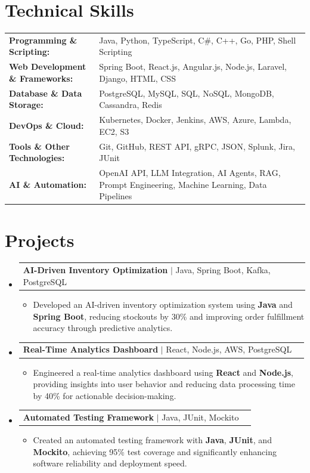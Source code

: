 \documentclass[letterpaper,10pt]{article}
\makeatletter
\newcommand{\resumeItem}[1]{
  \item{\fontsize{8pt}{9pt}\selectfont
    #1 \vspace{-3pt}
  }
}
\newcommand{\resumeProjectHeading}[2]{
    \item
    \begin{tabular*}{1.001\textwidth}{l@{\extracolsep{\fill}}r}
      \fontsize{8.5pt}{10pt}#1 & \textbf{\fontsize{8.5pt}{10pt} #2}\\
    \end{tabular*}\vspace{-7pt}
}
\newcommand{\resumeSubHeadingListStart}{\begin{itemize}[leftmargin=0pt, label={}]}
\newcommand{\resumeSubHeadingListEnd}{\end{itemize}}
\newcommand{\resumeItemListStart}{\begin{itemize}[leftmargin=*]}
\newcommand{\resumeItemListEnd}{\end{itemize}\vspace{-5pt}}
\makeatother
\begin{document}
\section{Technical Skills}
        \vspace{-14pt}
        \begin{table}[h]
            \fontsize{8pt}{9pt}\selectfont
            \begin{tabular}{p{0.3\linewidth} p{0.7\linewidth}}
                \textbf{Programming \& Scripting:} & Java, Python, TypeScript, C\#, C++, Go, PHP, Shell Scripting \\
                \textbf{Web Development \& Frameworks:} & Spring Boot, React.js, Angular.js, Node.js, Laravel, Django, HTML, CSS \\
                \textbf{Database \& Data Storage:} & PostgreSQL, MySQL, SQL, NoSQL, MongoDB, Cassandra, Redis \\
                \textbf{DevOps \& Cloud:} & Kubernetes, Docker, Jenkins, AWS, Azure, Lambda, EC2, S3 \\
                \textbf{Tools \& Other Technologies:} & Git, GitHub, REST API, gRPC, JSON, Splunk, Jira, JUnit \\
                \textbf{AI \& Automation:} & OpenAI API, LLM Integration, AI Agents, RAG, Prompt Engineering, Machine Learning, Data Pipelines \\
            \end{tabular}
        \end{table}
 \vspace{-18pt}

\section{Projects}
    \vspace{-5pt}
    \resumeSubHeadingListStart
          \resumeProjectHeading
            {\textbf{AI-Driven Inventory Optimization} $|$ Java, Spring Boot, Kafka, PostgreSQL}{}
            \resumeItemListStart
                \resumeItem{Developed an AI-driven inventory optimization system using \textbf{Java} and \textbf{Spring Boot}, reducing stockouts by 30\% and improving order fulfillment accuracy through predictive analytics.}
            \resumeItemListEnd
        \vspace{-12pt}
    
        \resumeProjectHeading
            {\textbf{Real-Time Analytics Dashboard} $|$ React, Node.js, AWS, PostgreSQL}{}
        \resumeItemListStart
                \resumeItem{Engineered a real-time analytics dashboard using \textbf{React} and \textbf{Node.js}, providing insights into user behavior and reducing data processing time by 40\% for actionable decision-making.}
        \resumeItemListEnd
      \vspace{-12pt}
      \resumeProjectHeading
        {\textbf{Automated Testing Framework} $|$ Java, JUnit, Mockito}{}
    \resumeItemListStart
            \resumeItem{Created an automated testing framework with \textbf{Java}, \textbf{JUnit}, and \textbf{Mockito}, achieving 95\% test coverage and significantly enhancing software reliability and deployment speed.}
    \resumeItemListEnd
    \resumeSubHeadingListEnd
\end{document}

